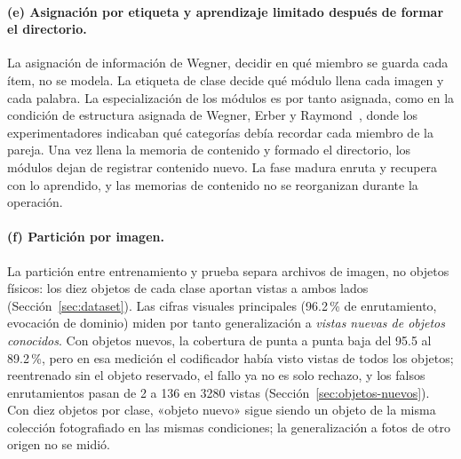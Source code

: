 \paragraph{(e) Asignación por etiqueta y aprendizaje limitado después de formar el directorio.}
La asignación de información de Wegner, decidir en qué miembro se guarda cada ítem, no
se modela.
La etiqueta de clase decide qué módulo llena cada imagen y cada palabra.
La especialización de los módulos es por tanto asignada, como en la condición de
estructura asignada de Wegner, Erber y Raymond~\cite{wegner1991transactive}, donde los
experimentadores indicaban qué categorías debía recordar cada miembro de la pareja.
Una vez llena la memoria de contenido y formado el directorio, los módulos dejan de
registrar contenido nuevo.
La fase madura enruta y recupera con lo aprendido, y las memorias de contenido no se
reorganizan durante la operación.

\paragraph{(f) Partición por imagen.}
La partición entre entrenamiento y prueba separa archivos de imagen, no objetos
físicos: los diez objetos de cada clase aportan vistas a ambos lados
(Sección~\ref{sec:dataset}).
Las cifras visuales principales (96.2\,\% de enrutamiento, evocación de dominio) miden
por tanto generalización a \emph{vistas nuevas de objetos conocidos}.
Con objetos nuevos, la cobertura de punta a punta baja del 95.5 al 89.2\,\%, pero en
esa medición el codificador había visto vistas de todos los objetos; reentrenado sin el
objeto reservado, el fallo ya no es solo rechazo, y los falsos enrutamientos pasan de 2
a 136 en 3280 vistas (Sección~\ref{sec:objetos-nuevos}).
Con diez objetos por clase, «objeto nuevo» sigue siendo un objeto de la misma
colección fotografiado en las mismas condiciones; la generalización a fotos de otro
origen no se midió.

